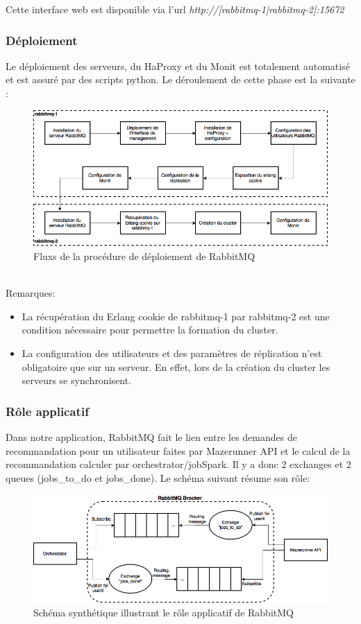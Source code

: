 Cette interface web est disponible via l'url \textit{http://[rabbitmq-1|rabbitmq-2]:15672}

\subsubsection{Déploiement}

Le déploiement des serveurs, du HaProxy et du Monit est totalement automatisé et est assuré par des scripts python. Le déroulement de cette phase est la suivante :
\ \\
\begin{figure}[h]
    \centering
    \includegraphics[scale=0.4]{pics/rabbitmq_deploy.png}
    \caption{Fluxs de la procédure de déploiement de RabbitMQ}
\end{figure}
\ \\
Remarques:
\begin{itemize}
	\item La récupération du Erlang cookie de rabbitmq-1 par rabbitmq-2 est une condition nécessaire pour permettre la formation du cluster.
	\item La configuration des utilisateurs et des paramètres de réplication n'est obligatoire que sur un serveur. En effet, lors de la création du cluster les serveurs se synchronisent.
\end{itemize}

\subsubsection{Rôle applicatif}

Dans notre application, RabbitMQ fait le lien entre les demandes de recommandation pour un utilisateur faites par Mazerunner API et le calcul de la recommandation calculer par orchestrator/jobSpark. Il y a donc 2 exchanges et 2 queues (jobs\_to\_do et jobs\_done). Le schéma suivant résume son rôle:
\ \\
\begin{figure}[h]
    \centering
    \includegraphics[scale=0.4]{pics/rabbitmq_role.png}
    \caption{Schéma synthétique illustrant le rôle applicatif de RabbitMQ}
\end{figure}
\FloatBarrier